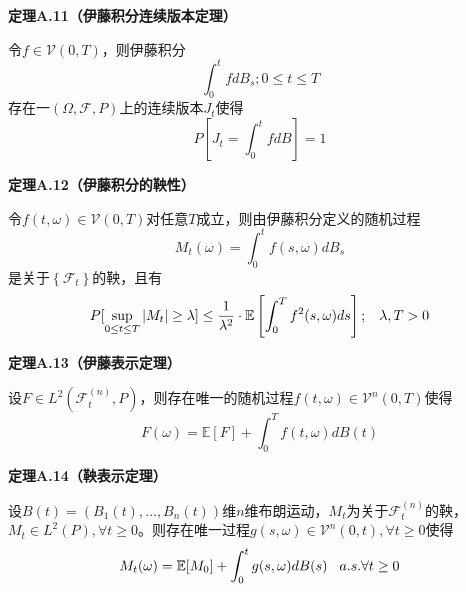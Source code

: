 \documentclass[UTF8，12pt]{ctexart}
\numberwithin{equation}{section}
\begin{document}
\vspace{0.3cm}
\noindent \textbf{定理A.11（伊藤积分连续版本定理）}

令$f\in\mathcal{V}(0,T)$，则伊藤积分
\[
\int_{0}^{t}fdB_s;0\le t\le T
\]
存在一$(\Omega,\mathcal{F},P)$上的连续版本$J_t$使得
\[
P\left[J_t=\int_{0}^{t}fdB\right]=1
\]

\vspace{0.3cm}
\noindent \textbf{定理A.12（伊藤积分的鞅性）}

令$f(t,\omega)\in\mathcal{V}(0,T)$对任意$T$成立，则由伊藤积分定义的随机过程
\[
M_t(\omega)=\int_{0}^{t}f(s,\omega)dB_s
\]
是关于$\left\{\mathcal{F}_t\right\}$的鞅，且有
\[
P[\sup_{0\le t\le T}\left\vert M_t\right\vert\ge\lambda]\le\frac{1}{\lambda^2}\cdot \mathbb{E}\left[\int_{0}^{T}f^2(s,\omega)ds\right];\hspace{0.3cm}\lambda,T>0
\]

\vspace{0.3cm}
\noindent \textbf{定理A.13（伊藤表示定理）}

设$F\in L^2(\mathcal{F}_t^{(n)},P)$，则存在唯一的随机过程$f(t,\omega)\in\mathcal{V}^n(0,T)$使得
\[
F(\omega)=\mathbb{E}[F]+\int_{0}^{T}f(t,\omega)dB(t)
\]

\vspace{0.3cm}
\noindent \textbf{定理A.14（鞅表示定理）}

设$B(t)=(B_1(t),\ldots,B_n(t))$维$n$维布朗运动，$M_t$为关于$\mathcal{F}_t^{(n)}$的鞅，$M_t\in L^2(P),\forall t\ge 0$。则存在唯一过程$g(s,\omega)\in\mathcal{V}^n(0,t),\forall t\ge 0$使得
\[
M_t(\omega)=\mathbb{E}[M_0]+\int_{0}^{t}g(s,\omega)dB(s)\hspace{0.3cm}a.s.\forall t\ge 0
\]
\end{document}

